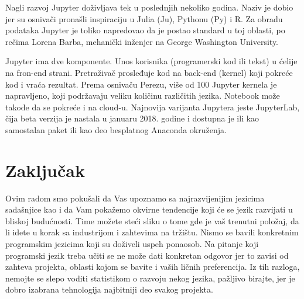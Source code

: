 \documentclass[a4paper]{article}
\begin{document}
Nagli razvoj Jupyter doživljava tek u poslednjih nekoliko godina. Naziv je dobio jer su osnivači pronašli inspiraciju u  Julia (Ju), Pythonu (Py) i R. Za obradu podataka Jupyter je toliko napredovao da je postao standard u toj oblasti, po rečima Lorena Barba, mehanički inženjer na George Washington University.

Jupyter ima dve komponente. Unos korisnika (programerski kod ili tekst) u ćelije na fron-end strani. Pretraživač prosleđuje kod na back-end (kernel) koji pokreće kod i vraća rezultat. Prema osnivaču Perezu, više od 100 Jupyter kernela je napravljeno, koji podržavaju veliku količinu različitih jezika. Notebook može takođe da se pokreće i na cloud-u. Najnovija varijanta Jupytera jeste JupyterLab, čija beta verzija je nastala u januaru 2018. godine i dostupna je ili kao samostalan paket ili kao deo besplatnog Anaconda okruženja.

\section{Zaključak}
\label{sec:zakljucak}

Ovim radom smo pokušali da Vas upoznamo sa najrazvijenijim jezicima sadašnjice kao i da Vam pokažemo okvirne tendencije koji će se jezik razvijati u bliskoj budućnosti. Time možete steći sliku o tome gde je vaš trenutni položaj, da li idete u korak sa industrijom i zahtevima na tržištu. Nismo se bavili konkretnim programskim jezicima koji su doživeli uspeh ponaosob. Na pitanje koji programski jezik treba učiti se ne može dati konkretan odgovor jer to zavisi od zahteva projekta, oblasti kojom se bavite i vaših ličnih preferencija. Iz tih razloga, nemojte se slepo voditi statistikom o razvoju nekog jezika, pažljivo birajte, jer je dobro izabrana tehnologija najbitniji deo svakog projekta.

\appendix



\end{document}
